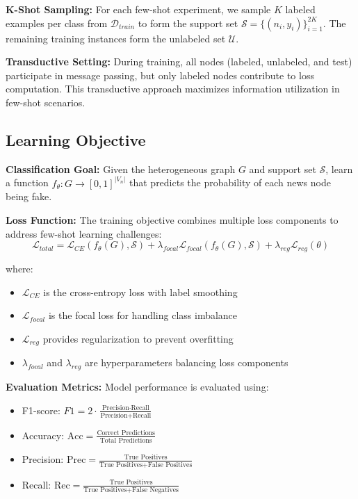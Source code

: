 \textbf{K-Shot Sampling:} For each few-shot experiment, we sample $K$ labeled examples per class from $\mathcal{D}_{train}$ to form the support set $\mathcal{S} = \{(n_i, y_i)\}_{i=1}^{2K}$. The remaining training instances form the unlabeled set $\mathcal{U}$.

\textbf{Transductive Setting:} During training, all nodes (labeled, unlabeled, and test) participate in message passing, but only labeled nodes contribute to loss computation. This transductive approach maximizes information utilization in few-shot scenarios.

\subsection{Learning Objective}

\textbf{Classification Goal:} Given the heterogeneous graph $G$ and support set $\mathcal{S}$, learn a function $f_{\theta}: G \rightarrow [0,1]^{|V_n|}$ that predicts the probability of each news node being fake.

\textbf{Loss Function:} The training objective combines multiple loss components to address few-shot learning challenges:
\begin{equation}
\mathcal{L}_{total} = \mathcal{L}_{CE}(f_{\theta}(G), \mathcal{S}) + \lambda_{focal} \mathcal{L}_{focal}(f_{\theta}(G), \mathcal{S}) + \lambda_{reg} \mathcal{L}_{reg}(\theta)
\end{equation}

where:
\begin{itemize}
\item $\mathcal{L}_{CE}$ is the cross-entropy loss with label smoothing
\item $\mathcal{L}_{focal}$ is the focal loss for handling class imbalance
\item $\mathcal{L}_{reg}$ provides regularization to prevent overfitting
\item $\lambda_{focal}$ and $\lambda_{reg}$ are hyperparameters balancing loss components
\end{itemize}

\textbf{Evaluation Metrics:} Model performance is evaluated using:
\begin{itemize}
\item F1-score: $F1 = 2 \cdot \frac{\text{Precision} \cdot \text{Recall}}{\text{Precision} + \text{Recall}}$
\item Accuracy: $\text{Acc} = \frac{\text{Correct Predictions}}{\text{Total Predictions}}$
\item Precision: $\text{Prec} = \frac{\text{True Positives}}{\text{True Positives} + \text{False Positives}}$
\item Recall: $\text{Rec} = \frac{\text{True Positives}}{\text{True Positives} + \text{False Negatives}}$
\end{itemize}

